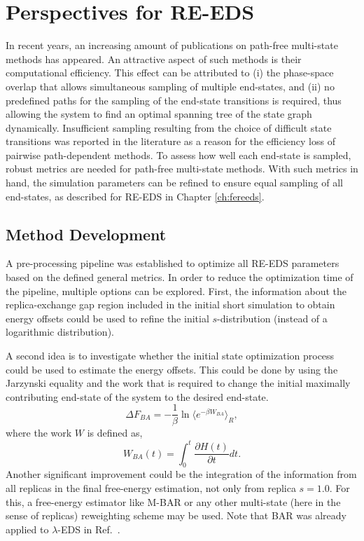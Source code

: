 
\section{Perspectives for RE-EDS}
In recent years, an increasing amount of publications on path-free multi-state methods has appeared. \cite{Donnini2011, Knight2011, Bieler2015, Sidler2016, Perthold2018} An attractive aspect of such methods is their computational efficiency. This effect can be attributed to (i) the phase-space overlap that allows simultaneous sampling of multiple end-states, and (ii) no predefined paths for the sampling of the end-state transitions is required, thus allowing the system to find an optimal spanning tree of the state graph dynamically. 
Insufficient sampling resulting from the choice of difficult state transitions was reported in the literature as a reason for the efficiency loss of pairwise path-dependent methods.\cite{Jespers2019}
To assess how well each end-state is sampled, robust metrics are needed for path-free multi-state methods. With such metrics in hand, the simulation parameters can be refined to ensure equal sampling of all end-states, as described for RE-EDS in Chapter \ref{ch:fereeds}. 

\subsection{Method Development}
A pre-processing pipeline was established to optimize all RE-EDS parameters based on the defined general metrics. 
In order to reduce the optimization time of the pipeline, multiple options can be explored. 
First, the information about the replica-exchange gap region included in the initial short simulation to obtain energy offsets could be used to refine the initial $s$-distribution (instead of a logarithmic distribution). 

A second idea is to investigate whether the initial state optimization process could be used to estimate the energy offsets. This could be done by using the Jarzynski equality and the work that is required to change the initial maximally contributing end-state of the system to the desired end-state. \cite{Jarzynski1997,  Xiong2006} 
\begin{equation}
	\Delta F_{BA} = -\frac{1}{\beta} \ln\langle e^{-\beta W_{BA}} \rangle_R ,
\end{equation}
where the work $W$ is defined as, \cite{Xiong2006}
\begin{equation}
	W_{BA}(t)= \int_{0}^{t} \frac{\partial H(t)}{\partial t} dt .
\end{equation}
%
Another significant improvement could be the integration of the information from all replicas in the final free-energy estimation, not only from replica $s=1.0$. 
For this, a free-energy estimator like M-BAR\cite{Shirts2008} or any other multi-state (here in the sense of replicas) reweighting scheme may be used. Note that BAR\cite{Bennett1976} was already applied to $\lambda$-EDS in Ref.~.

